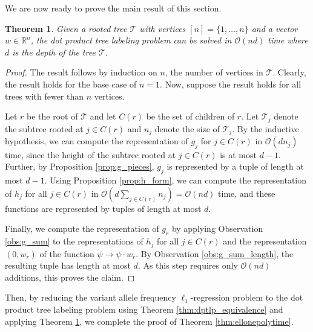\documentclass[10pt]{article}
\newtheorem{theorem}{Theorem}
\newcommand{\tree}{\mathcal{T}}
\begin{document}
We are now ready to prove the main result of this section.
\begin{theorem}
    \label{thm:dptlp_polytime}
    Given a rooted tree $\tree$ with vertices $[n] = \{1, \ldots, n\}$ and a vector $w \in \mathbb{R}^n$, the 
    dot product tree labeling problem can be solved in $\mathcal{O}(nd)$ time where $d$ is the depth of the tree $\tree$.
\end{theorem}
\begin{proof}
    The result follows by induction on $n$, the number of vertices in $\tree$. Clearly, the result holds for the base
    case of $n = 1$. Now, suppose the result holds for all trees with fewer than $n$ vertices.

    Let $r$ be the root of $\tree$ and let $C(r)$ be the set of children of $r$. Let $\tree_j$ denote the subtree rooted at
    $j \in C(r)$ and $n_j$ denote the size of $\tree_j$. By the inductive hypothesis, we can compute
    the representation of $g_j$ for $j \in C(r)$ in $\mathcal{O}(dn_j)$ time, since the height of the subtree rooted at 
    $j \in C(r)$ is at most $d - 1$. Further, by Proposition \ref{prop:g_pieces}, $g_j$ is represented by a 
    tuple of length at most $d - 1$. Using Proposition \ref{prop:h_form}, we can compute the representation of $h_j$ for all
    $j \in C(r)$ in $\mathcal{O}(d\sum_{j\in C(r)}n_j) = \mathcal{O}(nd)$ time, and these functions are represented by tuples of length at most $d$.

    Finally, we compute the representation of $g_r$ by applying Observation \ref{obs:g_sum} to the representations of 
    $h_j$ for all $j \in C(r)$ and the representation $(0, w_r)$ of the function $\psi \rightarrow \psi\cdot w_r$. 
    By Observation \ref{obs:g_sum_length}, the resulting tuple has 
    length at most $d$. As this step requires only $\mathcal{O}(nd)$ additions, this proves the claim.
\end{proof}

Then, by reducing the variant allele frequency $\ell_1$-regression problem to the dot product
tree labeling problem using Theorem \ref{thm:dptlp_equivalence} and applying Theorem \ref{thm:dptlp_polytime}, 
we complete the proof of Theorem \ref{thm:ellonepolytime}.


\newpage



\newpage
\appendix
\end{document}
